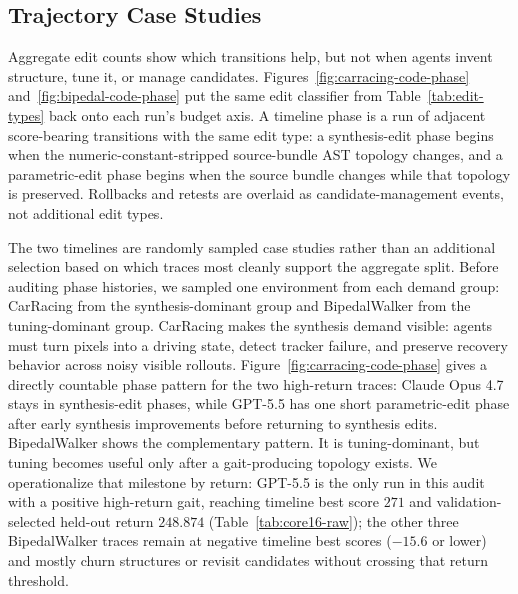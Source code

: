 \subsection{Trajectory Case Studies}
\label{sec:carracing-case}

Aggregate edit counts show which transitions help, but not when agents invent
structure, tune it, or manage candidates. Figures~\ref{fig:carracing-code-phase}
and~\ref{fig:bipedal-code-phase} put the same edit classifier from
Table~\ref{tab:edit-types} back onto each run's budget axis. A timeline phase is
a run of adjacent score-bearing transitions with the same edit type: a
synthesis-edit phase begins when the numeric-constant-stripped source-bundle AST
topology changes, and a parametric-edit phase begins when the source bundle
changes while that topology is preserved. Rollbacks and retests are overlaid as
candidate-management events, not additional edit types.


The two timelines are randomly sampled case studies rather than an additional
selection based on which traces most cleanly support the aggregate split.
Before auditing phase histories, we sampled one environment from each demand
group: CarRacing from the synthesis-dominant group and BipedalWalker from the
tuning-dominant group. CarRacing makes the synthesis demand visible: agents
must turn pixels into a driving state, detect tracker failure, and preserve
recovery behavior across noisy visible rollouts. Figure~\ref{fig:carracing-code-phase} gives a directly countable phase pattern for the two high-return traces: Claude Opus 4.7 stays in synthesis-edit phases, while GPT-5.5 has one short
parametric-edit phase after early synthesis improvements before returning to
synthesis edits. BipedalWalker shows the complementary pattern. It is tuning-dominant, but tuning becomes useful only after a gait-producing topology exists. We operationalize that milestone by return: GPT-5.5 is the only run in this audit with a positive high-return gait, reaching timeline best score $271$ and validation-selected held-out return $248.874$ (Table~\ref{tab:core16-raw}); the other three BipedalWalker traces remain at negative timeline best scores ($-15.6$ or lower) and mostly churn structures or revisit candidates without crossing that return threshold.



